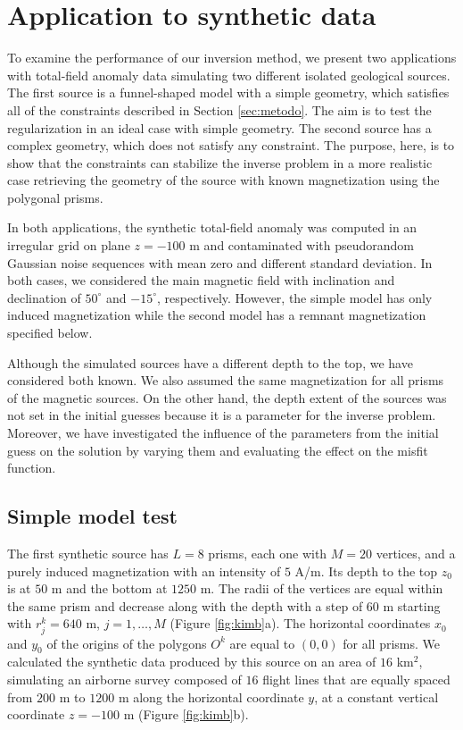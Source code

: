 \section{Application to synthetic data}

To examine the performance of our inversion method, we present two applications with total-field anomaly data simulating two different isolated geological sources. The first source is a funnel-shaped model with a simple geometry, which satisfies all of the constraints described in Section \ref{sec:metodo}. The aim is to test the regularization in an ideal case with simple geometry. The second source has a complex geometry, which does not satisfy any constraint. The purpose, here, is to show that the constraints can stabilize the inverse problem in a more realistic case retrieving the geometry of the source with known magnetization using the polygonal prisms.

In both applications, the synthetic total-field anomaly was computed in an irregular grid on plane $z=-100$ m and contaminated with pseudorandom Gaussian noise sequences with mean zero and different standard deviation. In both cases, we considered the main magnetic field with inclination and declination of $50^\circ$ and $-15^\circ$, respectively. However, the simple model has only induced magnetization while the second model has a remnant magnetization specified below.

Although the simulated sources have a different depth to the top, we have considered both known. We also assumed the same magnetization for all prisms of the magnetic sources. On the other hand, the depth extent of the sources was not set in the initial guesses because it is a parameter for the inverse problem. Moreover, we have investigated the influence of the parameters from the initial guess on the solution by varying them and evaluating the effect on the misfit function.

\subsection{Simple model test}

The first synthetic source has $L=8$ prisms, each one with $M = 20$ vertices, and a purely induced magnetization with an intensity of $5$ A/m. Its depth to the top $z_0$ is at $50$ m and the bottom at $1250$ m. The radii of the vertices are equal within the same prism and decrease along with the depth with a step of $60$ m starting with $r_j^k=640$ m, $j=1,\dots, M$ (Figure \ref{fig:kimb}a). The horizontal coordinates $x_0$ and $y_0$ of the origins of the polygons $O^k$ are equal to $(0,0)$ for all prisms. We calculated the synthetic data produced by this source on an area of $16$ km$^2$, simulating an airborne survey composed of $16$ flight lines that are equally spaced from $200$ m to $1200$ m along the horizontal coordinate $y$, at a constant vertical coordinate $z=-100$ m (Figure \ref{fig:kimb}b).

